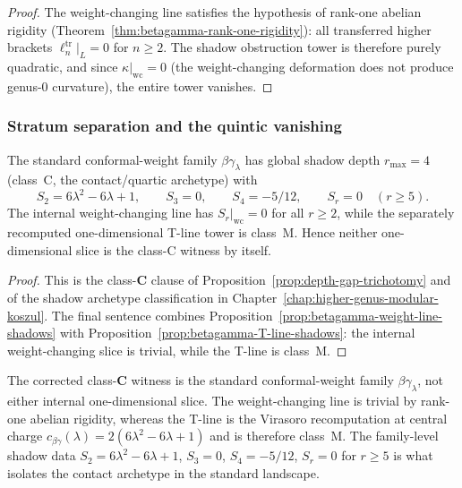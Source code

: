 \begin{proof}
The weight-changing line satisfies the hypothesis of rank-one abelian
rigidity (Theorem~\ref{thm:betagamma-rank-one-rigidity}): all
transferred higher brackets $\ell_n^{\mathrm{tr}}|_L = 0$ for
$n \geq 2$. The shadow obstruction tower is therefore purely quadratic, and since
$\kappa|_{\mathrm{wc}} = 0$ (the weight-changing deformation does not
produce genus-$0$ curvature), the entire tower
vanishes.\qedhere
\end{proof}

\subsubsection{Stratum separation and the quintic vanishing}

\begin{theorem}
\label{thm:betagamma-global-depth}
The standard conformal-weight family $\beta\gamma_\lambda$ has
global shadow depth $r_{\max} = 4$
\textup{(}class~C, the contact/quartic archetype\textup{)} with
\[
 S_2 = 6\lambda^2 - 6\lambda + 1,\qquad
 S_3 = 0,\qquad
 S_4 = -5/12,\qquad
 S_r = 0 \quad (r \geq 5).
\]
The internal weight-changing line has $S_r|_{\mathrm{wc}} = 0$ for all
$r \geq 2$, while the separately recomputed one-dimensional T-line tower
is class~M. Hence neither one-dimensional slice is the class-C witness
by itself.
\end{theorem}

\begin{proof}
This is the class-$\mathbf{C}$ clause of
Proposition~\ref{prop:depth-gap-trichotomy} and of the shadow
archetype classification in
Chapter~\ref{chap:higher-genus-modular-koszul}. The final sentence
combines Proposition~\ref{prop:betagamma-weight-line-shadows} with
Proposition~\ref{prop:betagamma-T-line-shadows}: the internal
weight-changing slice is trivial, while the T-line is class~M.\qedhere
\end{proof}

\begin{remark}
\label{rem:betagamma-stratum-separation-mechanism}
The corrected class-$\mathbf{C}$ witness is the standard
conformal-weight family $\beta\gamma_\lambda$, not either internal
one-dimensional slice. The weight-changing line is trivial by
rank-one abelian rigidity, whereas the T-line is the Virasoro
recomputation at central charge
$c_{\beta\gamma}(\lambda) = 2(6\lambda^2 - 6\lambda + 1)$ and is
therefore class~M. The family-level shadow data
$S_2 = 6\lambda^2 - 6\lambda + 1$, $S_3 = 0$,
$S_4 = -5/12$, $S_r = 0$ for $r \ge 5$ is what isolates the contact
archetype in the standard landscape.
\end{remark}

